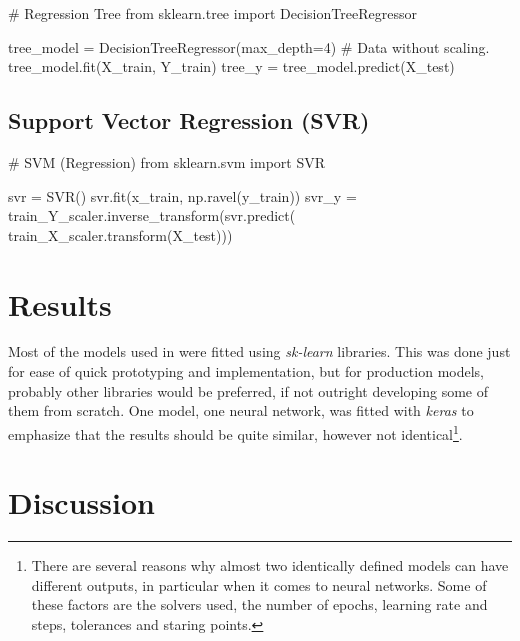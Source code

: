 \documentclass[11pt]{article}
\begin{document}
\begin{pyverbatim}[][]
# Regression Tree
from sklearn.tree import DecisionTreeRegressor

tree_model = DecisionTreeRegressor(max_depth=4)
# Data without scaling.
tree_model.fit(X_train, Y_train)
tree_y = tree_model.predict(X_test)
\end{pyverbatim}

\subsection{Support Vector Regression (SVR)}\label{subsec:support-vector-regression-(svr)}

\begin{pyverbatim}[][]
# SVM (Regression)
from sklearn.svm import SVR

svr = SVR()
svr.fit(x_train, np.ravel(y_train))
svr_y = train_Y_scaler.inverse_transform(svr.predict(
                                        train_X_scaler.transform(X_test)))
\end{pyverbatim}


\section{Results}\label{sec:results}

Most of the models used in  were fitted using \emph{sk-learn} libraries.
This was done just for ease of quick prototyping and implementation, but for production models, probably
other libraries would be preferred, if not outright developing some of them from scratch.
One model, one neural network, was fitted with \emph{keras} to emphasize that the results should be quite
similar, however not identical\footnote{There are several reasons why almost two identically defined models
can have different outputs, in particular when it comes to neural networks. Some of these factors are the
solvers used, the number of epochs, learning rate and steps, tolerances and staring points.}.






\section{Discussion}\label{sec:discussion}
\end{document}
